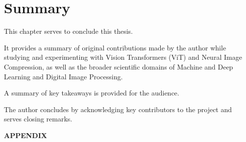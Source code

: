 \documentclass[pdftex,11pt,titlepage,twoside,openright]{report}
\begin{document}
\ThinHRule

\newpage


\chapter{Summary}

This chapter serves to conclude this thesis. 

It provides a summary 
of original contributions made by the author while studying and experimenting 
with Vision Transformers (ViT) and Neural Image Compression, as well as the broader 
scientific domains of Machine and Deep Learning and Digital Image Processing. 

A summary of key takeaways is provided for the audience.

The author concludes by acknowledging key contributors to the project and serves closing
remarks.


\ThinHRule

\newpage



{} %
\pagestyle{plain}






\newpage
{} %
\pagestyle{plain}
{\textbf{\LARGE{APPENDIX}}}\\	%

\end{document}
